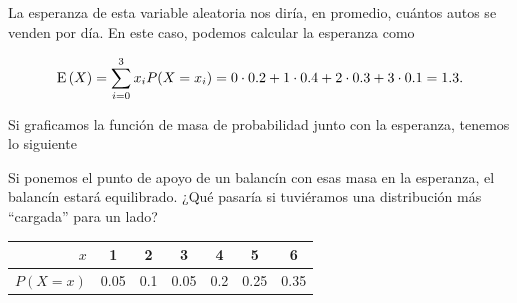 La esperanza de esta variable aleatoria nos diría, en promedio, cuántos autos se venden por día. En este caso, podemos calcular la esperanza como

\[
\operatorname{E}\left(X\right) = \sum_{i=0}^{3} x_i P(X=x_i) = 0 \cdot \num{0.2} + 1 \cdot \num{0.4} + 2 \cdot \num{0.3} + 3 \cdot \num{0.1} = \num{1.3}.
\]

Si graficamos la función de masa de probabilidad junto con la esperanza, tenemos lo siguiente

\begin{center}
\end{center}

Si ponemos el punto de apoyo de un balancín con esas masa en la esperanza, el balancín estará equilibrado. ¿Qué pasaría si tuviéramos una distribución más \enquote{cargada} para un lado?

\begin{center}
  \begin{tabular}{rSSSSSS}
  \(x\) & 1 & 2 & 3 & 4 & 5 & 6 \\\midrule
  \(P(X=x)\) & 0.05 & 0.1 & 0.05 & 0.2 & 0.25 & 0.35
  \end{tabular}
\end{center}

